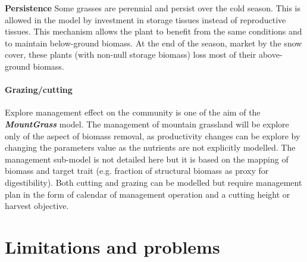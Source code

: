 \documentclass[a4paper,twoside, justified,marginals=raggedright]{tufte-handout}
\newcommand{\model}{\textit{\textbf{MountGrass }}}
\begin{document}
\textbf{Persistence} Some grasses are perennial and persist over the cold season. This is allowed in the model by investment in storage tissues instead of reproductive tissues. This mechanism allows the plant to benefit from the same conditions and to maintain below-ground biomass. At the end of the season, market by the snow cover, these plants (with non-null storage biomass) loss most of their above-ground biomass.

\paragraph{Grazing/cutting} Explore management effect on the community is one of the aim of the \model model. The management of mountain grassland will be explore only of the aspect of biomass removal, as productivity changes can be explore by changing the parameters value as the nutrients are not explicitly modelled. The management sub-model is not detailed here but it is based on the mapping of biomass and target trait (e.g. fraction of structural biomass as proxy for digestibility). Both cutting and grazing can be modelled but require management plan in the form of calendar of management operation and a cutting height or harvest objective.\\

\section{Limitations and problems}
\end{document}
